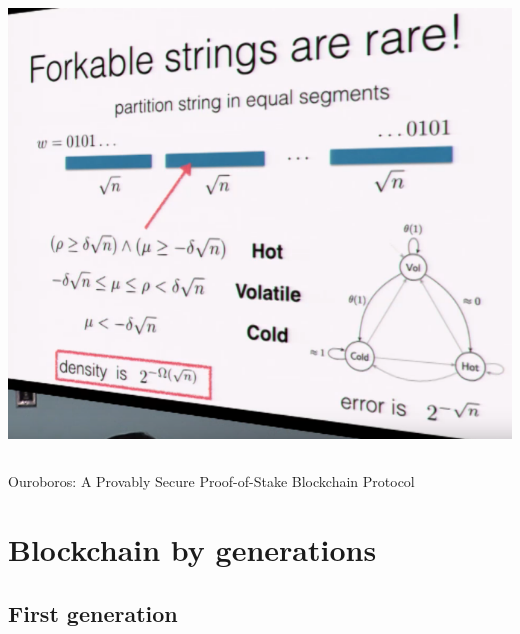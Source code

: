 \documentclass[notitlepage, usenames,dvipsnames]{beamer}
\begin{document}
\begin{frame}
\begin{overlayarea}{\textwidth}{0.85\textheight}
{\begin{columns}[c]
            \includegraphics[scale=0.255]{../img/ouroboros-2.png}
        \end{columns}
        \vspace{1ex}
        {\footnotesize Ouroboros: A Provably Secure Proof-of-Stake Blockchain Protocol}
    }
    
\end{overlayarea}
\end{frame}


\begin{frame}
    \frametitle{}

\end{frame}


\begin{frame}
    \frametitle{}

\end{frame}

\section{Blockchain by generations}
\subsection{First generation}
\begin{frame}
    \frametitle{}

\end{frame}
\end{document}
